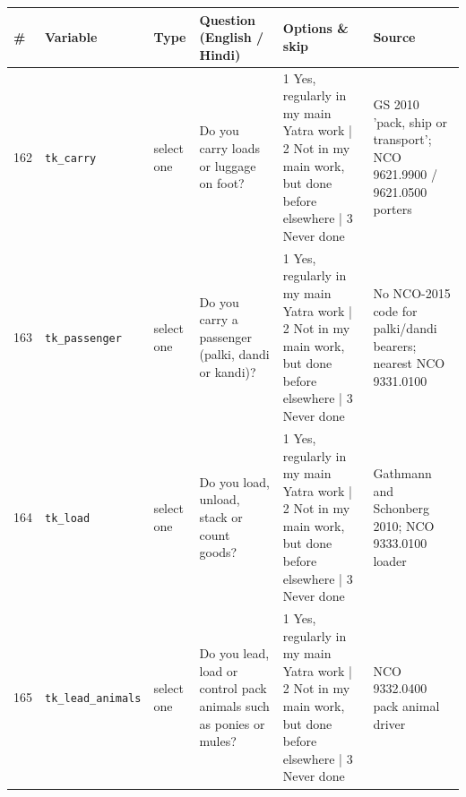 \documentclass[9pt,a4paper,landscape]{article}
\begin{document}
\begin{longtable}{@{}p{0.5cm}p{3.3cm}p{1.7cm}p{7.3cm}p{5.6cm}p{5.4cm}@{}}
\toprule \footnotesize\textbf{\#} & \footnotesize\textbf{Variable} & \footnotesize\textbf{Type} & \footnotesize\textbf{Question (English / Hindi)} & \footnotesize\textbf{Options {\&} skip} & \footnotesize\textbf{Source}\\ \midrule
\endhead
\footnotesize 162 & \footnotesize\texttt{tk\_carry} & \scriptsize select one & \footnotesize Do you carry loads or luggage on foot? \par\vspace{1pt}{\footnotesize\color{hdr}{\hifont क्या आप पैदल सामान या बोझ ढोना का काम करते हैं? (1 अपने मुख्य यात्रा-काम में नियमित; 2 मुख्य काम में नहीं, पर पहले कहीं और किया है; 3 कभी नहीं)}} & \scriptsize 1 Yes, regularly in my main Yatra work | 2 Not in my main work, but done before elsewhere | 3 Never done & \scriptsize GS 2010 'pack, ship or transport'; NCO 9621.9900 / 9621.0500 porters\\
\footnotesize 163 & \footnotesize\texttt{tk\_passenger} & \scriptsize select one & \footnotesize Do you carry a passenger (palki, dandi or kandi)? \par\vspace{1pt}{\footnotesize\color{hdr}{\hifont क्या आप सवारी ढोना (पालकी, डंडी या कंडी) का काम करते हैं? (1 अपने मुख्य यात्रा-काम में नियमित; 2 मुख्य काम में नहीं, पर पहले कहीं और किया है; 3 कभी नहीं)}} & \scriptsize 1 Yes, regularly in my main Yatra work | 2 Not in my main work, but done before elsewhere | 3 Never done & \scriptsize No NCO-2015 code for palki/dandi bearers; nearest NCO 9331.0100\\
\footnotesize 164 & \footnotesize\texttt{tk\_load} & \scriptsize select one & \footnotesize Do you load, unload, stack or count goods? \par\vspace{1pt}{\footnotesize\color{hdr}{\hifont क्या आप सामान चढ़ाना-उतारना, लगाना या गिनना का काम करते हैं? (1 अपने मुख्य यात्रा-काम में नियमित; 2 मुख्य काम में नहीं, पर पहले कहीं और किया है; 3 कभी नहीं)}} & \scriptsize 1 Yes, regularly in my main Yatra work | 2 Not in my main work, but done before elsewhere | 3 Never done & \scriptsize Gathmann and Schonberg 2010; NCO 9333.0100 loader\\
\footnotesize 165 & \footnotesize\texttt{tk\_lead\_animals} & \scriptsize select one & \footnotesize Do you lead, load or control pack animals such as ponies or mules? \par\vspace{1pt}{\footnotesize\color{hdr}{\hifont क्या आप घोड़े या खच्चर जैसे जानवरों को ले जाना या नियंत्रित करना का काम करते हैं? (1 अपने मुख्य यात्रा-काम में नियमित; 2 मुख्य काम में नहीं, पर पहले कहीं और किया है; 3 कभी नहीं)}} & \scriptsize 1 Yes, regularly in my main Yatra work | 2 Not in my main work, but done before elsewhere | 3 Never done & \scriptsize NCO 9332.0400 pack animal driver\\

\end{longtable}
\end{document}
